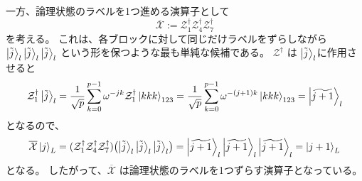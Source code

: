 \documentclass[../master.tex]{subfiles}
\begin{document}
一方、論理状態のラベルを1つ進める演算子として
\begin{equation}
    \overline{\mathcal{X}} := \mathcal{Z}_1^\dagger \mathcal{Z}_4^\dagger \mathcal{Z}_7^\dagger
\end{equation}
を考える。
これは、各ブロックに対して同じだけラベルをずらしながら
$\ket{\tilde{j}}_l\ket{\tilde{j}}_l\ket{\tilde{j}}_l$ という形を保つような最も単純な候補である。
$\mathcal{Z}^\dagger$ は $\ket{\tilde{j}}_l$に作用させると
\begin{equation}\begin{aligned}[b]
    \mathcal{Z}_1^\dagger\ket{\tilde{j}}_l
    = \frac{1}{\sqrt{p}}\sum_{k=0}^{p-1}\omega^{-jk}\mathcal{Z}_1^\dagger\ket{kkk}_{123}
    = \frac{1}{\sqrt{p}}\sum_{k=0}^{p-1}\omega^{-(j+1)k}\ket{kkk}_{123}
    = \ket{\widetilde{j+1}}_l
\end{aligned}\end{equation}
となるので、
\begin{equation}\begin{aligned}[b]
    \overline{\mathcal{X}}\ket{j}_L
    = (\mathcal{Z}_1^\dagger \mathcal{Z}_4^\dagger \mathcal{Z}_7^\dagger)
    \qty(\ket{\tilde{j}}_l \ket{\tilde{j}}_l \ket{\tilde{j}}_l)
    = \ket{\widetilde{j+1}}_l \ket{\widetilde{j+1}}_l \ket{\widetilde{j+1}}_l
    = \ket{j+1}_L
\end{aligned}\end{equation}
となる。
したがって、$\overline{\mathcal{X}}$ は論理状態のラベルを1つずらす演算子となっている。
\end{document}
